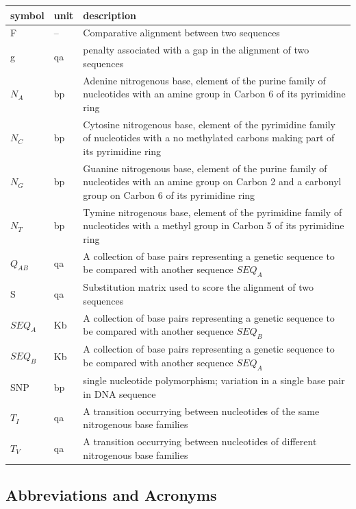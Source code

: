 \documentclass[12pt]{article}
\begin{document}
\renewcommand{\arraystretch}{1.2}
\noindent \begin{longtable*}{l l p{12cm}} \toprule
\textbf{symbol} & \textbf{unit} & \textbf{description}\\
\midrule 
  F & -- & Comparative alignment between two sequences
  \\
  g & qa & penalty associated with a gap in the alignment of two sequences
  \\
  $N_A$ & bp & Adenine nitrogenous base, element of the purine family of nucleotides with an amine group in Carbon 6 of its pyrimidine ring
  \\
  $N_C$ & bp & Cytosine nitrogenous base, element of the pyrimidine family of nucleotides with a no methylated carbons making part of its pyrimidine ring
  \\
  $N_G$ & bp & Guanine nitrogenous base, element of the purine family of nucleotides with an amine group on Carbon 2 and a carbonyl group on Carbon 6 of its pyrimidine ring
  \\
  $N_T$ & bp & Tymine nitrogenous base, element of the pyrimidine family of nucleotides with a methyl group in Carbon 5 of its pyrimidine ring
  \\
  $Q_{AB}$ & qa & A collection of base pairs representing a genetic sequence to be compared with another sequence $SEQ_A$
  \\
  S & qa & Substitution matrix used to score the alignment of two sequences
  \\
  $SEQ_A$ & Kb & A collection of base pairs representing a genetic sequence to be compared with another sequence $SEQ_B$
  \\
  $SEQ_B$ & Kb & A collection of base pairs representing a genetic sequence to be compared with another sequence $SEQ_A$
  \\
  SNP & bp & single nucleotide polymorphism; variation in a single base pair in DNA sequence
  \\
  $T_I$ & qa & A transition occurrying between nucleotides of the same nitrogenous base families
  \\
  $T_V$ & qa & A transition occurrying between nucleotides of different nitrogenous base families
  \\
\bottomrule
\end{longtable*}

\subsection{Abbreviations and Acronyms}
\end{document}
